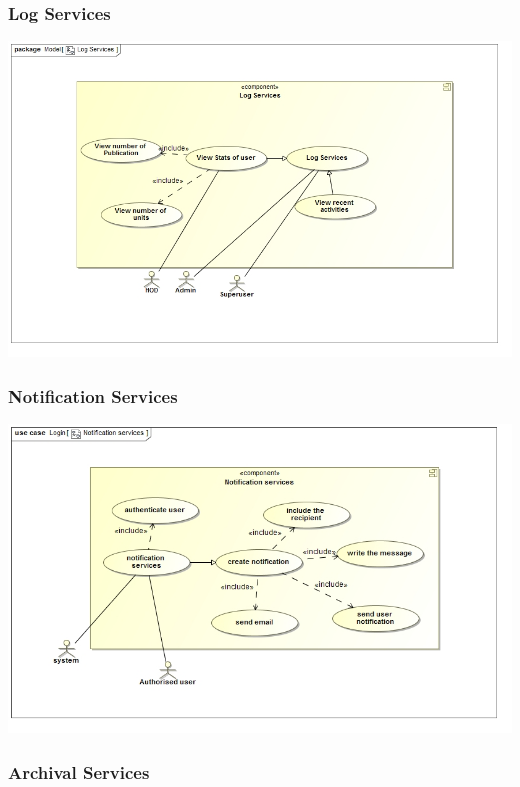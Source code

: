 \documentclass[11pt]{article}
\begin{document}
	\subsubsection{Log Services}
	\begin{center}
		\includegraphics[width=\textwidth]{../Images/LogServicesUC.jpg}\\[0.5cm]
	\end{center}
	\subsubsection{Notification Services}
	\begin{center}
		\includegraphics[width=\textwidth]{../Images/NotificationServicesUC.jpg}\\[0.5cm]
	\end{center}
	\subsubsection{Archival Services}
	
\end{document}
